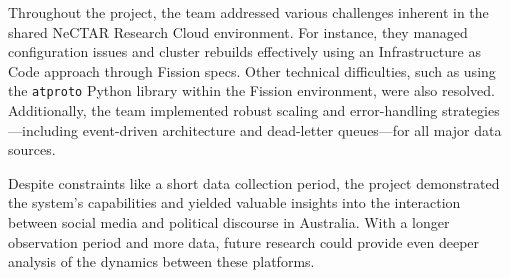 \documentclass[]{article}
\numberwithin{equation}{section}
\begin{document}
Throughout the project, the team addressed various challenges inherent in the shared NeCTAR Research Cloud environment. For instance, they managed configuration issues and cluster rebuilds effectively using an Infrastructure as Code approach through Fission specs. Other technical difficulties, such as using the \texttt{atproto} Python library within the Fission environment, were also resolved. Additionally, the team implemented robust scaling and error-handling strategies—including event-driven architecture and dead-letter queues—for all major data sources.

Despite constraints like a short data collection period, the project demonstrated the system's capabilities and yielded valuable insights into the interaction between social media and political discourse in Australia. With a longer observation period and more data, future research could provide even deeper analysis of the dynamics between these platforms.
\end{document}
